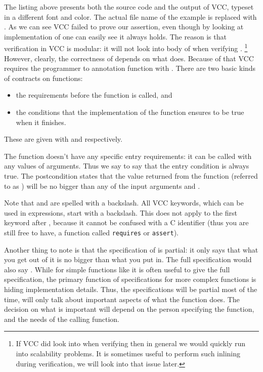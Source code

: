 
\noindent
The listing above presents both the source code and the output
of VCC, typeset in a different font and color.
The actual file name of the example is replaced with .
As we can see VCC failed to prove our assertion,
even though by looking at implementation of 
one can easily see it always holds.
The reason is that verification in VCC is modular:
it will not look into body of  when
verifying .%
\footnote{
  If VCC did look into  when verifying 
  then in general we would quickly run into scalability problems.
  It is sometimes useful to perform such inlining during verification,
  we will look into that issue later.
}
However, clearly, the correctness of  depends on what 
does.
Because of that VCC requires the programmer to annotation function
with .
There are two basic kinds of contracts on functions:
\begin{itemize}
\item the requirements before the function is called, and
\item the conditions that the implementation of the function ensures to be true when it finishes.
\end{itemize}
These are given with  and  respectively.


\noindent
The function  doesn't have any specific entry requirements:
it can be called with any values of arguments.
Thus we say  to say that the entry condition is
always true.
The postcondition states that the value returned from the function (referred to as \vcc{\result})
will be no bigger than any of the input arguments  and .

Note that \vcc{\true} and \vcc{\result} are spelled with a backslash.
All VCC keywords, which can be used in expressions, start with a backslash.
This does not apply to the first keyword after , because it cannot
be confused with a C identifier (thus you are still free to have, \eg
a function called \texttt{requires} or \texttt{assert}).

Another thing to note is that the specification of  is partial:
it only says that what you get out of it is no bigger than what you put in.
The full specification would also say .
While for simple functions like  it is often useful to give the full
specification, the primary function of specifications for more complex
functions is hiding implementation details.
Thus, the specifications will be partial most of the time, will only
talk about important aspects of what the function does.
The decision on what is important will depend on the person specifying
the function, and the needs of the calling function.

